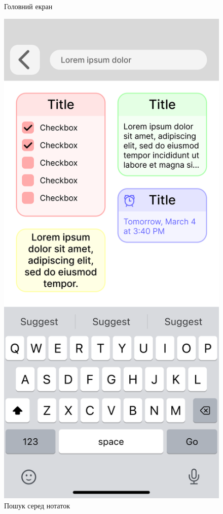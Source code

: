 \documentclass[oneside,14pt]{extarticle}
\begin{document}
\begin{normalsize}
\begin{figure}[H]
\begin{minipage}{0.48\textwidth}
			\caption{Головний екран}
		\end{minipage}\hfill
		\begin{minipage}{0.48\textwidth}
			\centering
			\includegraphics[scale=0.12]{Frame 2}
			\caption{Пошук серед нотаток}
		\end{minipage}
	\end{figure}
	

\end{normalsize}
\end{document}
